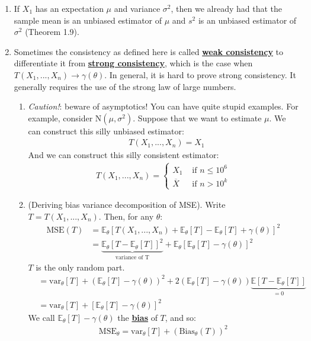 \documentclass[11pt]{scrartcl}
\theoremstyle{definition}
\theoremstyle{remark}
\newcommand{\dfn}[1]{\textbf{\underline{#1}}}
\newcommand{\stat}[0]{T(X_1, ..., X_n )}
\newcommand{\EX}[1]{\mathbb{E}\left[#1 \right]}
\newcommand{\EXth}[1]{\mathbb{E}_\theta \left[ #1 \right]}
\begin{document}
\begin{enumerate}[noitemsep]
	\item If $X_1$ has an expectation $\mu$ and variance $\sigma^2$, then we already had that the sample mean is an unbiased estimator of $\mu$ and $s^2$ is an unbiased estimator of $\sigma^2$ (Theorem 1.9). 
	\item Sometimes the consistency as defined here is called \dfn{weak consistency} to differentiate it from \dfn{strong consistency}, which is the case when $\stat \rightarrow \gamma(\theta)$. In general, it is hard to prove strong consistency. It generally requires the use of the strong law of large numbers. 
	\begin{enumerate}[noitemsep]
		\item \emph{Caution!}: beware of asymptotics! You can have quite stupid examples. For example, consider N$(\mu, \sigma^2)$. Suppose that we want to estimate $\mu$. We can construct this silly unbiased estimator: 
		\begin{align*}	
			& T(X_1, ..., X_n) = X_1 
		\end{align*}
		And we can construct this silly consistent estimator: 
		\begin{align*} 
		 \stat = \begin{cases}
				X_1 & \text{ if } n \leq 10^6 \\
				\overline{X} & \text{ if } n > 10^k
			\end{cases}	
		\end{align*}
	\item (Deriving bias variance decomposition of MSE). Write $T = \stat$. Then, for any $\theta$: 
		\begin{align*}
				\text{MSE}(T) &  = \EXth{\stat + \EXth{T} - \EXth{T} + \gamma(\theta) }^2 \\
					& = \underbrace{\EXth{T - \EXth{T} }^2}_{\text{variance of T}} + \EXth{ \EXth{T} - \gamma(\theta) }^2 
		\end{align*}
		$T$ is the only random part. 
		\begin{align*}
			& = \text{var}_\theta[T] + (\EXth{T}- \gamma(\theta))^2 + 2(\EXth{T} - \gamma(\theta))\underbrace{\EX{T - \EXth{T}}}_{=0} \\
			& = \text{var}_\theta[T] + [\EXth{T} - \gamma(\theta)]^2 
		\end{align*}
		We call $\EXth{T}-\gamma(\theta)$ the \dfn{bias} of $T$, and so: 
		\begin{align}
			\text{MSE}_\theta = \text{var}_\theta[T] + (\text{Bias}_\theta(T))^2 
		\end{align}
	\end{enumerate}
\end{enumerate}
\end{document}
